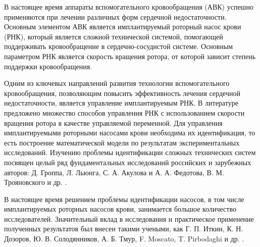 {\actuality}


В настоящее время аппараты вспомогательного кровообращения (АВК) успешно применяются при лечении различных форм сердечной недостаточности. Основным элементом АВК является имплантируемый роторный насос крови (РНК), который является сложной технической системой, помогающей поддерживать кровообращение в сердечно-сосудистой системе. Основным параметром РНК является скорость вращения ротора, от которой зависит степень поддержки кровообращения.

% 

Одним из ключевых направлений развития технологии вспомогательного кровообращения, позволяющим повысить эффективность лечения сердечной недостаточности, является управление имплантируемым РНК. В литературе предложено множество способов управления РНК с использованием скорости вращения ротора в качестве управляемой переменной. Для управления имплантируемыми роторными насосами крови необходима их идентификация, то есть построение математической модели по результатам экспериментальных исследований. Изучению проблемы идентификации сложных технических систем посвящен целый ряд фундаментальных исследований российских и зарубежных авторов: Д. Гроппа, Л. Льюнга, С. А. Акулова и А. А. Федотова, В. М. Трояновского и др. \cite{identification_usa, identification_ljung, biotech_basics, trojan}. %

В настоящее время решением проблемы идентификации насосов, в том числе имплантируемых роторных насосов крови, занимается большое количество исследователей. Значительный вклад в исследования и практическое применение полученных результатов был внесен такими учеными, как Г. П. Иткин, К. Н. Дозоров, Ю. В. Солодянников, А. Б. Тмур, F. Moscato, T. Pirbodaghi и др. \cite{vest_2015, dozorov_2009, solod_1994, tmur_2014, Moscato_2009, Pirbodaghi_2017}.%

